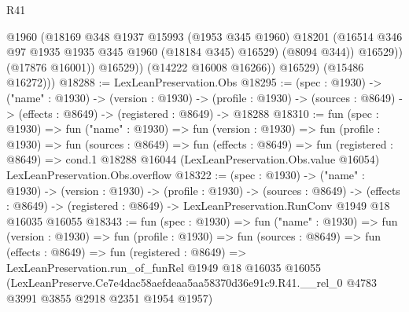 \begin{lexlean}{R41}
\begin{coremodule}
                      @1960
                      (@18169
                        @348
                        @1937
                        @15993
                        (@1953 @345 @1960)
                        @18201
                        (@16514 @346 @97 @1935 @1935 @345 @1960 (@18184 @345) @16529)
                        (@8094 @344))
                      @16529))
                  (@17876 @16001))
                @16529))
            (@14222 @16008 @16266))
          @16529)
        (@15486 @16272)))
@18288 := LexLeanPreservation.Obs
@18295 := (spec : @1930) ->
  ("name" : @1930) ->
  (version : @1930) ->
  (profile : @1930) -> (sources : @8649) -> (effects : @8649) -> (registered : @8649) -> @18288
@18310 := fun (spec : @1930) =>
  fun ("name" : @1930) =>
  fun (version : @1930) =>
  fun (profile : @1930) =>
  fun (sources : @8649) =>
  fun (effects : @8649) =>
  fun (registered : @8649) =>
  cond.{1} @18288 @16044 (LexLeanPreservation.Obs.value @16054) LexLeanPreservation.Obs.overflow
@18322 := (spec : @1930) ->
  ("name" : @1930) ->
  (version : @1930) ->
  (profile : @1930) ->
  (sources : @8649) ->
  (effects : @8649) -> (registered : @8649) -> LexLeanPreservation.RunConv @1949 @18 @16035 @16055
@18343 := fun (spec : @1930) =>
  fun ("name" : @1930) =>
  fun (version : @1930) =>
  fun (profile : @1930) =>
  fun (sources : @8649) =>
  fun (effects : @8649) =>
  fun (registered : @8649) =>
  LexLeanPreservation.run_of_funRel
    @1949
    @18
    @16035
    @16055
    (LexLeanPreserve.Ce7e4dac58aefdeaa5aa58370d36e91c9.R41.__rel_0
      @4783
      @3991
      @3855
      @2918
      @2351
      @1954
      @1957)
\end{coremodule}
\end{lexlean}
